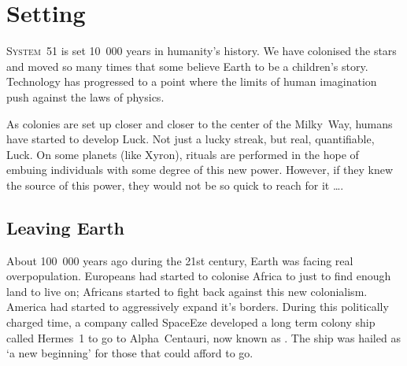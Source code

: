 







\listofproposals

\chapter{Setting}
\label{cha:history}


\textsc{System~51} is set 10~000 years in humanity's history. We have colonised
the stars and moved so many times that some believe Earth to be a children's
story. Technology has progressed to a point where the limits of human
imagination push against the laws of physics.

As colonies are set up closer and closer to the center of the
Milky~Way, humans have started to develop Luck. Not just a lucky streak, but
real, quantifiable, Luck. On some planets (like Xyron), rituals are performed in
the hope of embuing individuals with some degree of this new power. However, if
they knew the source of this power, they would not be so quick to reach for it
\ldots{}.


\section{Leaving Earth}
\label{sec:leaving-earth}

About 100~000 years ago during the 21st century, Earth was facing real
overpopulation. Europeans had started to colonise Africa to just to find enough
land to live on; Africans started to fight back against this new colonialism.
America had started to aggressively expand it's borders. During this politically
charged time, a company called SpaceEze developed a long term colony ship called
Hermes~1 to go to Alpha~Centauri, now known as . The ship was hailed
as `a new beginning' for those that could afford to go.

